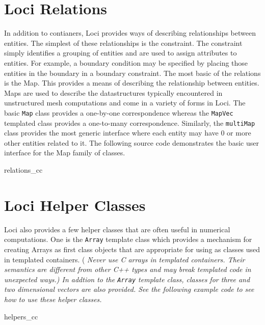 \documentclass[10pt,epsf]{book}
\begin{document}
\section {Loci Relations}
In addition to contianers, Loci provides ways of describing
relationships between entities.  The simplest of these relationships
is the constraint.  The constraint simply identifies a grouping of
entities and are used to assign attributes to entities.  For example,
a boundary condition may be specified by placing those entities in the
boundary in a boundary constraint.  The most basic of the relations is
the Map.  This provides a means of describing the relationship between
entities.  Maps are used to describe the datastructures typically
encountered in unstructured mesh computations and come in a variety of
forms in Loci.  The basic {\tt Map} class provides a one-by-one
correspondence whereas the {\tt MapVec} templated class provides a
one-to-many correspondence.  Similarly, the {\tt multiMap} class
provides the most generic interface where each entity may have 0 or
more other entities related to it.  The following source code
demonstrates the basic user interface for the Map family of classes.


 {relations_cc}

\section{Loci Helper Classes}

Loci also provides a few helper classes that are often useful in
numerical computations.  One is the {\tt Array} template class which provides a
mechanism for creating Arrays as first class objects that are
appropriate for using as classes used in templated containers. (\it
Never use C arrays in templated containers.  Their semantics are
different from other C++ types and may break templated code in
unexpected ways.)  In addtion to the {\tt Array} template class,
classes for three and two dimensional vectors are also provided.  See
the following example code to see how to use these helper classes.

 {helpers_cc}

\end{document}
